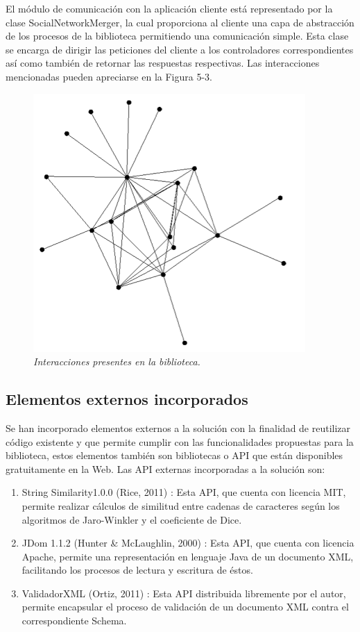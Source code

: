 El módulo de comunicación con la aplicación cliente está representado por la clase SocialNetworkMerger, la cual proporciona al cliente una capa de abstracción de los procesos de la biblioteca permitiendo una comunicación simple. Esta clase se encarga de dirigir las peticiones del cliente a los controladores correspondientes así como también de retornar las respuestas respectivas. Las interacciones mencionadas pueden apreciarse en la Figura 5-3.


\begin{figure}[H]
	\centering
	\includegraphics[scale=.7]{images/Figura5-3}
	\caption{\em Interacciones presentes en la biblioteca.}
	\label{fig:des-im3}
\end{figure}

\subsection{Elementos externos incorporados}

Se han incorporado elementos externos a la solución con la finalidad de reutilizar código existente y que permite cumplir con las funcionalidades propuestas para la biblioteca, estos elementos también son bibliotecas o API que están disponibles gratuitamente en la Web. Las API externas incorporadas a la solución son:

\begin{enumerate}
\item String Similarity1.0.0 (Rice, 2011) : Esta API, que cuenta con licencia MIT, permite realizar cálculos de similitud entre cadenas de caracteres según los algoritmos de Jaro-Winkler y el coeficiente de Dice. 
\item JDom 1.1.2 (Hunter \& McLaughlin, 2000) : Esta API, que cuenta con licencia Apache, permite una representación en lenguaje Java de un documento XML, facilitando los procesos de lectura y escritura de éstos.
\item ValidadorXML (Ortiz, 2011) : Esta API distribuida libremente por el autor, permite encapsular el proceso de validación de un documento XML contra el correspondiente Schema.
\end{enumerate}


